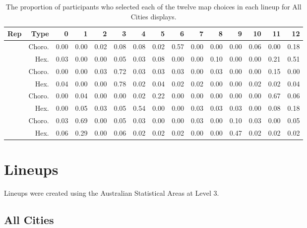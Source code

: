 \documentclass{monashthesis}
\begin{document}
\begin{table}

\caption{\label{tab:choice-all}The proportion of participants who selected each of the twelve map choices in each lineup for All Cities displays.}
\centering
\begin{tabular}[t]{rrrrrrrrrrrrrrr}
\toprule
Rep & Type & 0 & 1 & 2 & 3 & 4 & 5 & 6 & 7 & 8 & 9 & 10 & 11 & 12\\
\midrule
 & Choro. & 0.00 & 0.00 & 0.02 & 0.08 & 0.08 & 0.02 & 0.57 & 0.00 & 0.00 & 0.00 & 0.06 & 0.00 & 0.18\\
\cmidrule{2-15}
\multirow{-2}{*}{\raggedleft\arraybackslash 1} & Hex. & 0.03 & 0.00 & 0.00 & 0.05 & 0.03 & 0.08 & 0.00 & 0.00 & 0.10 & 0.00 & 0.00 & 0.21 & 0.51\\
\cmidrule{1-15}
 & Choro. & 0.00 & 0.00 & 0.03 & 0.72 & 0.03 & 0.03 & 0.03 & 0.00 & 0.03 & 0.00 & 0.00 & 0.15 & 0.00\\
\cmidrule{2-15}
\multirow{-2}{*}{\raggedleft\arraybackslash 2} & Hex. & 0.04 & 0.00 & 0.00 & 0.78 & 0.02 & 0.04 & 0.02 & 0.02 & 0.00 & 0.00 & 0.02 & 0.02 & 0.04\\
\cmidrule{1-15}
 & Choro. & 0.00 & 0.04 & 0.00 & 0.00 & 0.02 & 0.22 & 0.00 & 0.00 & 0.00 & 0.00 & 0.00 & 0.67 & 0.06\\
\cmidrule{2-15}
\multirow{-2}{*}{\raggedleft\arraybackslash 3} & Hex. & 0.00 & 0.05 & 0.03 & 0.05 & 0.54 & 0.00 & 0.00 & 0.03 & 0.03 & 0.03 & 0.00 & 0.08 & 0.18\\
\cmidrule{1-15}
 & Choro. & 0.03 & 0.69 & 0.00 & 0.05 & 0.03 & 0.00 & 0.00 & 0.03 & 0.00 & 0.10 & 0.03 & 0.00 & 0.05\\
\cmidrule{2-15}
\multirow{-2}{*}{\raggedleft\arraybackslash 4} & Hex. & 0.06 & 0.29 & 0.00 & 0.06 & 0.02 & 0.02 & 0.02 & 0.00 & 0.00 & 0.47 & 0.02 & 0.02 & 0.02\\
\bottomrule
\end{tabular}
\end{table}

\hypertarget{lineups-1}{%
\section{Lineups}\label{lineups-1}}

Lineups were created using the Australian Statistical Areas at Level 3.

\hypertarget{all-cities}{%
\subsection{All Cities}\label{all-cities}}
\end{document}
